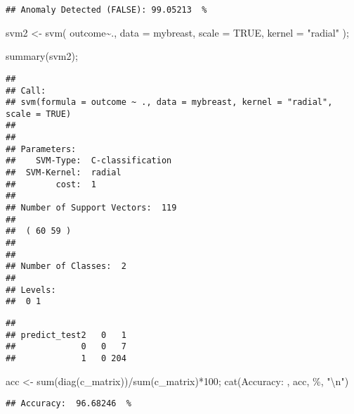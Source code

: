 \documentclass[
]{article}
\newenvironment{Shaded}{\begin{snugshade}}{\end{snugshade}}
\newcommand{\AttributeTok}[1]{\textcolor[rgb]{0.77,0.63,0.00}{#1}}
\newcommand{\ConstantTok}[1]{\textcolor[rgb]{0.00,0.00,0.00}{#1}}
\newcommand{\DecValTok}[1]{\textcolor[rgb]{0.00,0.00,0.81}{#1}}
\newcommand{\FunctionTok}[1]{\textcolor[rgb]{0.00,0.00,0.00}{#1}}
\newcommand{\NormalTok}[1]{#1}
\newcommand{\OtherTok}[1]{\textcolor[rgb]{0.56,0.35,0.01}{#1}}
\newcommand{\SpecialCharTok}[1]{\textcolor[rgb]{0.00,0.00,0.00}{#1}}
\newcommand{\StringTok}[1]{\textcolor[rgb]{0.31,0.60,0.02}{#1}}
\begin{document}
\begin{verbatim}
## Anomaly Detected (FALSE): 99.05213  %
\end{verbatim}

\begin{Shaded}
\begin{Highlighting}[]
\NormalTok{svm2 }\OtherTok{\textless{}{-}} \FunctionTok{svm}\NormalTok{(}
\NormalTok{  outcome}\SpecialCharTok{\textasciitilde{}}\NormalTok{.,}
  \AttributeTok{data =}\NormalTok{ mybreast,}
  \AttributeTok{scale =} \ConstantTok{TRUE}\NormalTok{,}
  \AttributeTok{kernel =} \StringTok{"radial"}
\NormalTok{);}

\FunctionTok{summary}\NormalTok{(svm2);}
\end{Highlighting}
\end{Shaded}

\begin{verbatim}
## 
## Call:
## svm(formula = outcome ~ ., data = mybreast, kernel = "radial", scale = TRUE)
## 
## 
## Parameters:
##    SVM-Type:  C-classification 
##  SVM-Kernel:  radial 
##        cost:  1 
## 
## Number of Support Vectors:  119
## 
##  ( 60 59 )
## 
## 
## Number of Classes:  2 
## 
## Levels: 
##  0 1
\end{verbatim}

\begin{Shaded}
\end{Shaded}

\begin{verbatim}
##              
## predict_test2   0   1
##             0   0   7
##             1   0 204
\end{verbatim}

\begin{Shaded}
\begin{Highlighting}[]
\NormalTok{acc }\OtherTok{\textless{}{-}} \FunctionTok{sum}\NormalTok{(}\FunctionTok{diag}\NormalTok{(c\_matrix))}\SpecialCharTok{/}\FunctionTok{sum}\NormalTok{(c\_matrix)}\SpecialCharTok{*}\DecValTok{100}\NormalTok{;}
\FunctionTok{cat}\NormalTok{(}\StringTok{\textquotesingle{}Accuracy: \textquotesingle{}}\NormalTok{, acc, }\StringTok{\textquotesingle{} \%\textquotesingle{}}\NormalTok{, }\StringTok{"}\SpecialCharTok{\textbackslash{}n}\StringTok{"}\NormalTok{)}
\end{Highlighting}
\end{Shaded}

\begin{verbatim}
## Accuracy:  96.68246  %
\end{verbatim}
\end{document}
